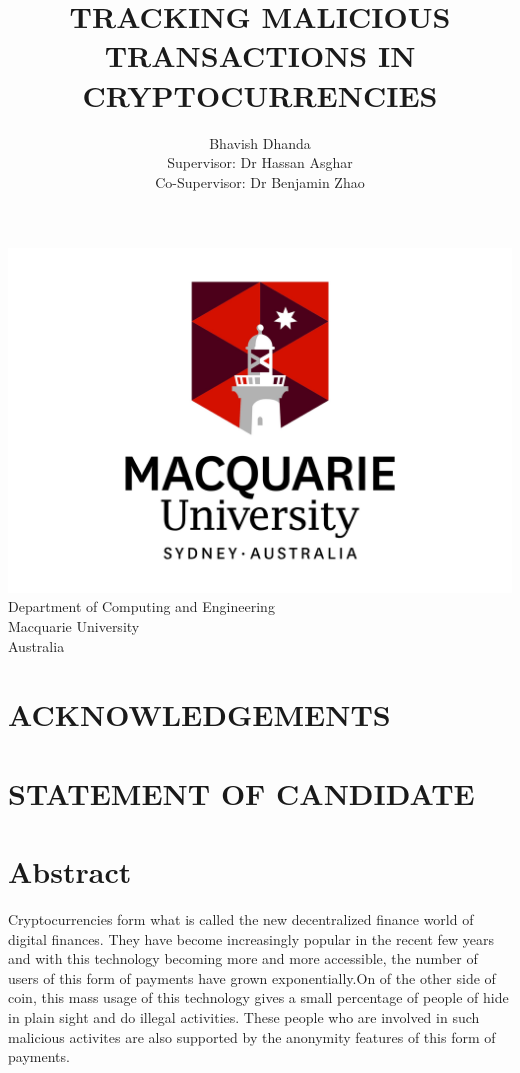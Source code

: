 \documentclass{article}
\begin{document}
\begin{titlepage}
\title{TRACKING MALICIOUS TRANSACTIONS IN CRYPTOCURRENCIES}
\author{Bhavish Dhanda {\\ Supervisor: Dr Hassan Asghar} {\\ Co-Supervisor: Dr Benjamin Zhao}}
\date{}
\end{titlepage}
\maketitle
\begin{center}
    \includegraphics[width=0.7\linewidth]{logo.jpg}\\[4ex]
    Department of Computing and Engineering\\
    Macquarie University\\
    Australia
\end{center}
\pagebreak

\begin{center}
    \section*{ACKNOWLEDGEMENTS}
        \pagebreak
    \section*{STATEMENT OF CANDIDATE}
        \pagebreak
\end{center}

\tableofcontents
\pagebreak
\listoffigures
\pagebreak
\lstlistoflistings
\pagebreak

\section{Abstract}
Cryptocurrencies form what is called the new decentralized finance world of digital finances. They have become increasingly popular in the recent few years and with this technology becoming more and more accessible, the number of users of this form of payments have grown exponentially.On of the other side of coin, this mass usage of this technology gives a small percentage of people of hide in plain sight and do illegal activities. These people who are involved in such malicious activites are also supported by the anonymity features of this form of payments. 
\end{document}
